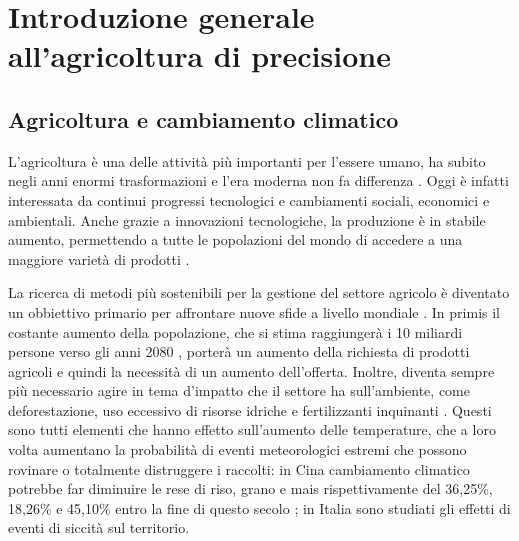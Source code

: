 \documentclass[12pt,a4paper,openright,twoside]{book}
\begin{document}

\section{Introduzione generale all’agricoltura di precisione}\label{introduzione-agricoltura-precisione}

\subsection{Agricoltura e cambiamento climatico}

L'agricoltura è una delle attività più importanti per l'essere umano, ha subito negli anni enormi trasformazioni e l'era moderna non fa differenza \cite{FEDERICO-FEEDING-2005}. Oggi è infatti interessata da continui progressi tecnologici e cambiamenti sociali, economici e ambientali. Anche grazie a innovazioni tecnologiche, la produzione è in stabile aumento, permettendo a tutte le popolazioni del mondo di accedere a una maggiore varietà di prodotti \cite{FAO-AGRO-STATS-2023}.

La ricerca di metodi più sostenibili per la gestione del settore agricolo è diventato un obbiettivo primario per affrontare nuove sfide a livello mondiale \cite{SDG-2-4-1}. In primis il costante aumento della popolazione, che si stima raggiungerà i 10 miliardi persone verso gli anni 2080 \cite{UN-POPULATION-2024}, porterà un aumento della richiesta di prodotti agricoli e quindi la necessità di un aumento dell'offerta. Inoltre, diventa sempre più necessario agire in tema d'impatto che il settore ha sull'ambiente, come deforestazione, uso eccessivo di risorse idriche e fertilizzanti inquinanti \cite{EIOM-2012}. Questi sono tutti elementi che hanno effetto sull'aumento delle temperature, che a loro volta aumentano la probabilità di eventi meteorologici estremi che possono rovinare o totalmente distruggere i raccolti: in Cina cambiamento climatico potrebbe far diminuire le rese di riso, grano e mais rispettivamente del 36,25\%, 18,26\% e 45,10\% entro la fine di questo secolo \cite{ZHANG-PENG-2017}; in Italia sono studiati gli effetti di eventi di siccità sul territorio.
\end{document}
